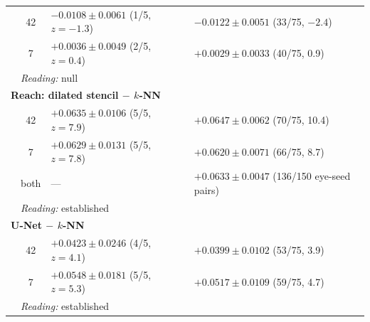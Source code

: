 \begin{table}[!h]
\begin{tabular}{l c l l}
    & 42 & $-0.0108 \pm 0.0061$ (1/5, $z = -1.3$) & $-0.0122 \pm 0.0051$ (33/75, $-2.4$) \\
    & 7  & $+0.0036 \pm 0.0049$ (2/5, $z = 0.4$) & $+0.0029 \pm 0.0033$ (40/75, 0.9) \\
    & \multicolumn{3}{l}{\emph{Reading:} null} \\[2pt]
    \multicolumn{4}{l}{\textbf{Reach: dilated stencil $-$ $k$-NN}} \\
    & 42 & $+0.0635 \pm 0.0106$ (5/5, $z = 7.9$) & $+0.0647 \pm 0.0062$ (70/75, 10.4) \\
    & 7  & $+0.0629 \pm 0.0131$ (5/5, $z = 7.8$) & $+0.0620 \pm 0.0071$ (66/75, 8.7) \\
    & both & --- & $+0.0633 \pm 0.0047$ (136/150 eye-seed pairs) \\
    & \multicolumn{3}{l}{\emph{Reading:} established} \\[2pt]
    \multicolumn{4}{l}{\textbf{U-Net $-$ $k$-NN}} \\
    & 42 & $+0.0423 \pm 0.0246$ (4/5, $z = 4.1$) & $+0.0399 \pm 0.0102$ (53/75, 3.9) \\
    & 7  & $+0.0548 \pm 0.0181$ (5/5, $z = 5.3$) & $+0.0517 \pm 0.0109$ (59/75, 4.7) \\
    & \multicolumn{3}{l}{\emph{Reading:} established} \\
    \bottomrule
  \end{tabular}
\end{table}

